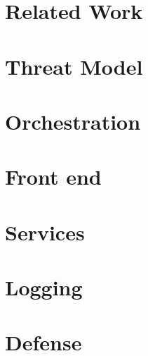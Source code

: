 \documentclass[letterpaper,twocolumn,10pt]{article}
\begin{document}
\section{Related Work} \label{Related Work}


\section{Threat Model} \label{Threat Model}


\section{Orchestration} \label{Orchestration}


\section{Front end} \label{Front End}


\section{Services} \label{Services}


\section{Logging} \label{Logging}


\section{Defense} \label{Defense}
\end{document}
